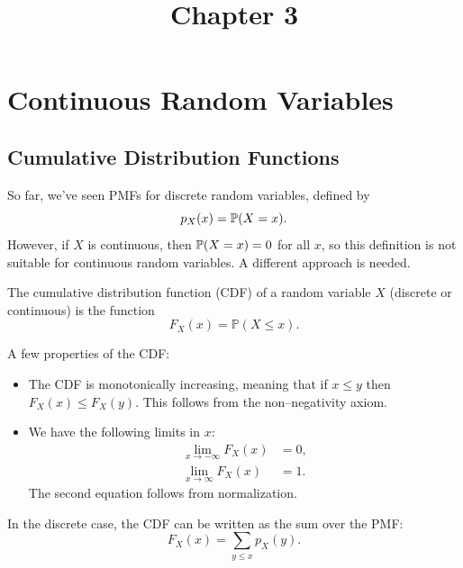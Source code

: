 \documentclass{ximera}
\title{Chapter 3}
\begin{document}
\begin{abstract}
\end{abstract}
\maketitle
\section{Continuous Random Variables}


\subsection{Cumulative Distribution Functions}
So far, we've seen PMFs for discrete random variables, defined by
$$
p_X(x) = \mathbb{P}(X=x).
$$
However, if $X$ is continuous, then $\mathbb{P}(X=x)=0$ for all $x$, so this definition is not suitable for continuous random variables. A different approach is needed.

\begin{definition}
The cumulative distribution function (CDF) of a random variable $X$ (discrete or continuous) is the function
$$
F_X(x) = \mathbb{P}(X \leq x).
$$
\end{definition}

A few properties of the CDF:
\begin{itemize}
\item
The CDF is monotonically increasing, meaning that if $x \leq y$ then $F_X(x) \leq F_X(y)$. This follows from the non--negativity axiom.
\item
We have the following limits in $x$:
\begin{align*}
\lim_{x \rightarrow -\infty} F_X(x) &= 0,\\
\lim_{x \rightarrow  \infty} F_X(x) &= 1.
\end{align*}
The second equation follows from normalization.
\end{itemize}

In the discrete case, the CDF can be written as the sum over the PMF:
$$
F_X(x) = \sum_{y \leq x} p_X(y).
$$
\end{document}
